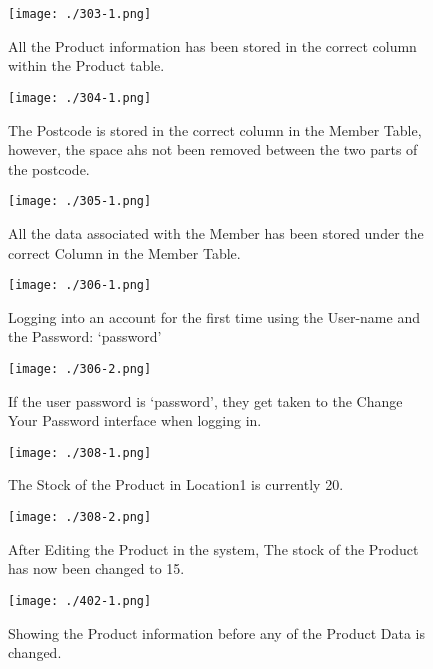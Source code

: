 \begin{figure}[H]
    \texttt{[image: ./303-1.png]}
    \caption{All the Product information has been stored in the correct column within the Product table.} \label{fig:303-1}
\end{figure}

\begin{figure}[H]
    \texttt{[image: ./304-1.png]}
    \caption{The Postcode is stored in the correct column in the Member Table, however, the space ahs not been removed between the two parts of the postcode.} \label{fig:304-1}
\end{figure}

\begin{figure}[H]
    \texttt{[image: ./305-1.png]}
    \caption{All the data associated with the Member has been stored under the correct Column in the Member Table.} \label{fig:305-1}
\end{figure}

\begin{figure}[H]
    \texttt{[image: ./306-1.png]}
    \caption{Logging into an account for the first time using the User-name and the Password: `password' } \label{fig:306-1}
\end{figure}

\begin{figure}[H]
    \texttt{[image: ./306-2.png]}
    \caption{If the user password is `password', they get taken to the Change Your Password interface when logging in. } \label{fig:306-2}
\end{figure}

\begin{figure}[H]
    \texttt{[image: ./308-1.png]}
    \caption{The Stock of the Product in Location1 is currently 20.} \label{fig:308-1}
\end{figure}

\begin{figure}[H]
    \texttt{[image: ./308-2.png]}
    \caption{After Editing the Product in the system, The stock of the Product has now been changed to 15.} \label{fig:308-2}
\end{figure}

\begin{figure}[H]
    \texttt{[image: ./402-1.png]}
    \caption{Showing the Product information before any of the Product Data is changed.} \label{fig:402-1}
\end{figure}

